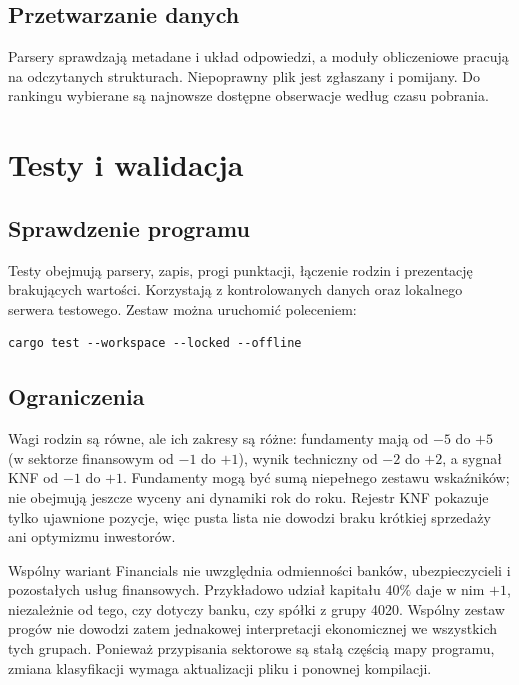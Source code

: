 \documentclass[12pt,a4paper,twoside]{report}
\begin{document}
\section{Przetwarzanie danych}

Parsery sprawdzają metadane i układ odpowiedzi, a moduły obliczeniowe pracują na odczytanych strukturach. Niepoprawny plik jest zgłaszany i pomijany. Do rankingu wybierane są najnowsze dostępne obserwacje według czasu pobrania.


\cleardoublepage
\chapter{Testy i walidacja}
\label{chap:tests}

\section{Sprawdzenie programu}

Testy obejmują parsery, zapis, progi punktacji, łączenie rodzin i prezentację brakujących wartości. Korzystają z kontrolowanych danych oraz lokalnego serwera testowego. Zestaw można uruchomić poleceniem:
\begin{verbatim}
cargo test --workspace --locked --offline
\end{verbatim}


\section{Ograniczenia}
\label{sec:limitations}

Wagi rodzin są równe, ale ich zakresy są różne: fundamenty mają od $-5$ do $+5$ (w sektorze finansowym od $-1$ do $+1$), wynik techniczny od $-2$ do $+2$, a sygnał KNF od $-1$ do $+1$. Fundamenty mogą być sumą niepełnego zestawu wskaźników; nie obejmują jeszcze wyceny ani dynamiki rok do roku. Rejestr KNF pokazuje tylko ujawnione pozycje, więc pusta lista nie dowodzi braku krótkiej sprzedaży ani optymizmu inwestorów.

Wspólny wariant Financials nie uwzględnia odmienności banków, ubezpieczycieli i pozostałych usług finansowych. Przykładowo udział kapitału $40\%$ daje w nim $+1$, niezależnie od tego, czy dotyczy banku, czy spółki z grupy 4020. Wspólny zestaw progów nie dowodzi zatem jednakowej interpretacji ekonomicznej we wszystkich tych grupach. Ponieważ przypisania sektorowe są stałą częścią mapy programu, zmiana klasyfikacji wymaga aktualizacji pliku i ponownej kompilacji.
\end{document}
